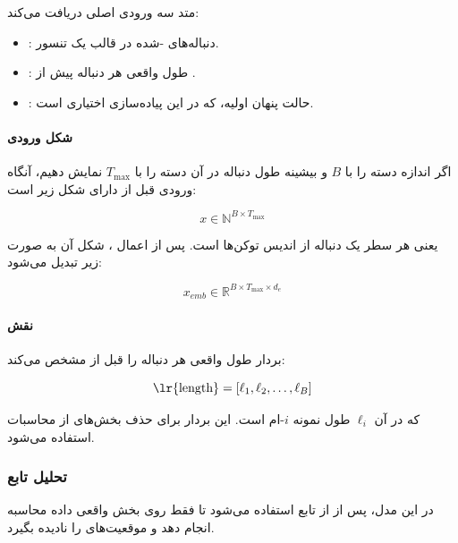 \documentclass{article}
\begin{document}
متد  سه ورودی اصلی دریافت می‌کند:

\begin{itemize}
	\item {}: دنباله‌های -شده در قالب یک تنسور.
	\item {}: طول واقعی هر دنباله پیش از .
	\item {}: حالت پنهان اولیه، که در این پیاده‌سازی اختیاری است.
\end{itemize}

\paragraph{شکل ورودی }
اگر اندازه دسته را با \(B\) و بیشینه طول دنباله در آن دسته را با \(T_{\max}\) نمایش دهیم، آنگاه ورودی  قبل از  دارای شکل زیر است:

\begin{equation}
	x \in \mathbb{N}^{B \times T_{\max}}
\end{equation}

یعنی هر سطر یک دنباله از اندیس توکن‌ها است. پس از اعمال ، شکل آن به صورت زیر تبدیل می‌شود:

\begin{equation}
	x_{emb} \in \mathbb{R}^{B \times T_{\max} \times d_e}
\end{equation}

\paragraph{نقش }
بردار  طول واقعی هر دنباله را قبل از  مشخص می‌کند:

\begin{equation}
	\text{\lr{length}} = [\ell_1,\ell_2,\dots,\ell_B]
\end{equation}

که در آن \(\ell_i\) طول نمونه \(i\)-ام است. این بردار برای حذف بخش‌های  از محاسبات  استفاده می‌شود.

\subsubsection{تحلیل تابع }

در این مدل، پس از  از تابع  استفاده می‌شود تا  فقط روی بخش واقعی داده محاسبه انجام دهد و موقعیت‌های  را نادیده بگیرد.
\end{document}

